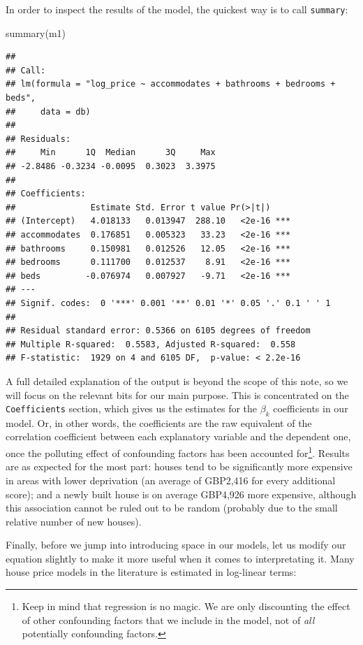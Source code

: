 \documentclass[
]{book}
\newenvironment{Shaded}{\begin{snugshade}}{\end{snugshade}}
\newcommand{\FunctionTok}[1]{\textcolor[rgb]{0.00,0.00,0.00}{#1}}
\newcommand{\NormalTok}[1]{#1}
\begin{document}
In order to inspect the results of the model, the quickest way is to call \texttt{summary}:

\begin{Shaded}
\begin{Highlighting}[]
\FunctionTok{summary}\NormalTok{(m1)}
\end{Highlighting}
\end{Shaded}

\begin{verbatim}
## 
## Call:
## lm(formula = "log_price ~ accommodates + bathrooms + bedrooms + beds", 
##     data = db)
## 
## Residuals:
##     Min      1Q  Median      3Q     Max 
## -2.8486 -0.3234 -0.0095  0.3023  3.3975 
## 
## Coefficients:
##               Estimate Std. Error t value Pr(>|t|)    
## (Intercept)   4.018133   0.013947  288.10   <2e-16 ***
## accommodates  0.176851   0.005323   33.23   <2e-16 ***
## bathrooms     0.150981   0.012526   12.05   <2e-16 ***
## bedrooms      0.111700   0.012537    8.91   <2e-16 ***
## beds         -0.076974   0.007927   -9.71   <2e-16 ***
## ---
## Signif. codes:  0 '***' 0.001 '**' 0.01 '*' 0.05 '.' 0.1 ' ' 1
## 
## Residual standard error: 0.5366 on 6105 degrees of freedom
## Multiple R-squared:  0.5583, Adjusted R-squared:  0.558 
## F-statistic:  1929 on 4 and 6105 DF,  p-value: < 2.2e-16
\end{verbatim}

A full detailed explanation of the output is beyond the scope of this note, so we will focus on the relevant bits for our main purpose. This is concentrated on the \texttt{Coefficients} section, which gives us the estimates for the \(\beta_k\) coefficients in our model. Or, in other words, the coefficients are the raw equivalent of the correlation coefficient between each explanatory variable and the dependent one, once the polluting effect of confounding factors has been accounted for\footnote{Keep in mind that regression is no magic. We are only discounting the effect of other confounding factors that we include in the model, not of \emph{all} potentially confounding factors.}. Results are as expected for the most part: houses tend to be significantly more expensive in areas with lower deprivation (an average of GBP2,416 for every additional score); and a newly built house is on average GBP4,926 more expensive, although this association cannot be ruled out to be random (probably due to the small relative number of new houses).

Finally, before we jump into introducing space in our models, let us modify our equation slightly to make it more useful when it comes to interpretating it. Many house price models in the literature is estimated in log-linear terms:
\end{document}
